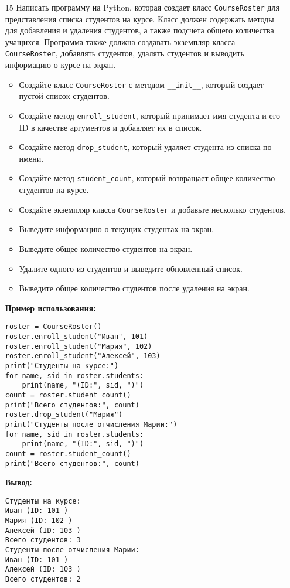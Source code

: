 \begin{enumerate}
\item[15] Написать программу на Python, которая создает класс \texttt{CourseRoster} для представления списка студентов на курсе. Класс должен содержать методы для добавления и удаления студентов, а также подсчета общего количества учащихся. Программа также должна создавать экземпляр класса \texttt{CourseRoster}, добавлять студентов, удалять студентов и выводить информацию о курсе на экран.

\begin{itemize}
    \item Создайте класс \texttt{CourseRoster} с методом \texttt{\_\_init\_\_}, который создает пустой список студентов.
    \item Создайте метод \texttt{enroll\_student}, который принимает имя студента и его ID в качестве аргументов и добавляет их в список.
    \item Создайте метод \texttt{drop\_student}, который удаляет студента из списка по имени.
    \item Создайте метод \texttt{student\_count}, который возвращает общее количество студентов на курсе.
    \item Создайте экземпляр класса \texttt{CourseRoster} и добавьте несколько студентов.
    \item Выведите информацию о текущих студентах на экран.
    \item Выведите общее количество студентов на экран.
    \item Удалите одного из студентов и выведите обновленный список.
    \item Выведите общее количество студентов после удаления на экран.
\end{itemize}

\textbf{Пример использования:}

\begin{verbatim}
roster = CourseRoster()
roster.enroll_student("Иван", 101)
roster.enroll_student("Мария", 102)
roster.enroll_student("Алексей", 103)
print("Студенты на курсе:")
for name, sid in roster.students:
    print(name, "(ID:", sid, ")")
count = roster.student_count()
print("Всего студентов:", count)
roster.drop_student("Мария")
print("Студенты после отчисления Марии:")
for name, sid in roster.students:
    print(name, "(ID:", sid, ")")
count = roster.student_count()
print("Всего студентов:", count)
\end{verbatim}

\textbf{Вывод:}
\begin{verbatim}
Студенты на курсе:
Иван (ID: 101 )
Мария (ID: 102 )
Алексей (ID: 103 )
Всего студентов: 3
Студенты после отчисления Марии:
Иван (ID: 101 )
Алексей (ID: 103 )
Всего студентов: 2
\end{verbatim}


\end{enumerate}
